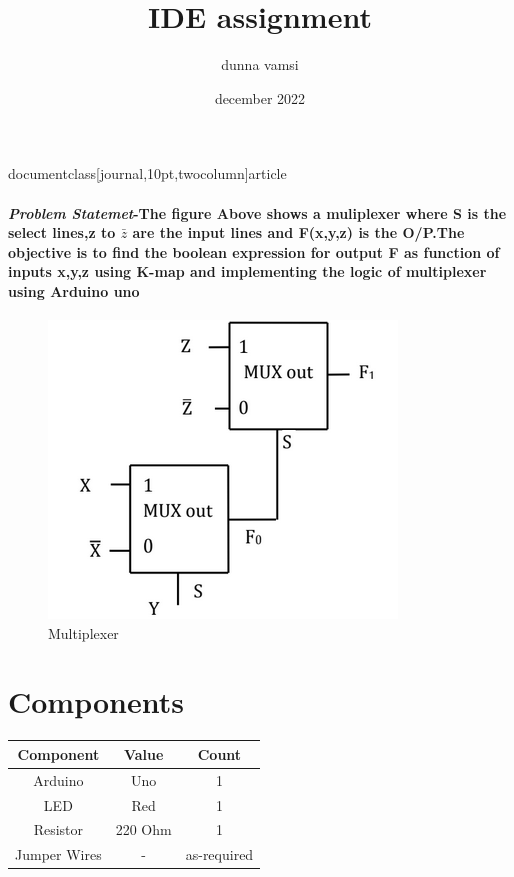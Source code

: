 documentclass[journal,10pt,twocolumn]{article}
\usepackage{graphicx}
\usepackage[margin=0.5in]{geometry}
\usepackage{amsmath}
\usepackage{kvmap}
\usepackage{float}
\usepackage{lmodern}
\renewcommand*\familydefault{\sfdefault}
\usepackage{watermark}
\usepackage{karnaugh-map}
\usepackage{lipsum}
\usepackage{xcolor}
\usepackage{listings}
\usepackage{float}
\usepackage{titlesec}
\usepackage{amsmath}
\usepackage{algorithm2e}

\title{IDE assignment}
\author{dunna vamsi}
\date{december 2022}



\maketitle
\paragraph{\textit{Problem Statemet}-The figure Above shows a muliplexer where S is the select lines,z to $\bar{z}$ are the input lines and F(x,y,z) is the O/P.The objective is to find the boolean expression for output F as function of inputs x,y,z using K-map and implementing the logic of multiplexer using Arduino uno}

\begin{figure}[!h]
\centering
\includegraphics[scale=0.2]{ide.png}
\caption{Multiplexer}
\label{fig:mux}
\end{figure}
\section{ Components}
{
\centering
\begin{tabular}{|c|c|c|}
\hline
Component&Value&Count\\
\hline
Arduino &Uno& 1\\
\hline
LED & Red &1\\
\hline
Resistor&220 Ohm&1\\
\hline
Jumper Wires&-&as-required\\
\hline
\end{tabular}
}
